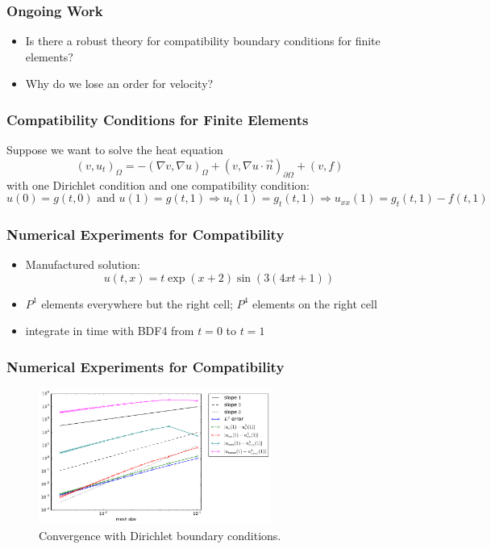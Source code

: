 \documentclass[8pt]{beamer}
\begin{document}
\begin{frame}
    \frametitle{Ongoing Work}
    \begin{itemize}
        \item Is there a robust theory for compatibility boundary conditions for
              finite elements?
        \item Why do we lose an order for velocity?
    \end{itemize}
\end{frame}

\begin{frame}
    \frametitle{Compatibility Conditions for Finite Elements}
    Suppose we want to solve the heat equation
    \begin{equation}
        (v, u_t)_{\Omega} =
        -(\nabla v, \nabla u)_{\Omega}
        + (v, \nabla u \cdot \vec{n})_{\partial \Omega}
        + (v, f)
    \end{equation}
    with one Dirichlet condition and one compatibility condition:
    \begin{equation}
        u(0) = g(t, 0) \text{ and }
        u(1) = g(t, 1) \Rightarrow u_{t}(1) = g_t(t, 1)
        \Rightarrow u_{xx}(1) = g_t(t, 1) - f(t, 1)
    \end{equation}
\end{frame}

\begin{frame}
    \frametitle{Numerical Experiments for Compatibility}
    \begin{itemize}
        \item Manufactured solution:
              \begin{equation}
                  u(t, x) = t \exp(x + 2) \sin(3 (4 x t + 1))
              \end{equation}
        \item \(P^1\) elements everywhere but the right cell; \(P^4\) elements
              on the right cell
        \item integrate in time with BDF4 from \(t = 0\) to \(t = 1\)
    \end{itemize}
\end{frame}

\begin{frame}
    \frametitle{Numerical Experiments for Compatibility}
    \begin{figure}
        \centering
        \includegraphics[width=3in]{bdf4_mid_september_dirichlet.pdf}

        \caption{Convergence with Dirichlet boundary conditions.}
    \end{figure}
\end{frame}
\end{document}

